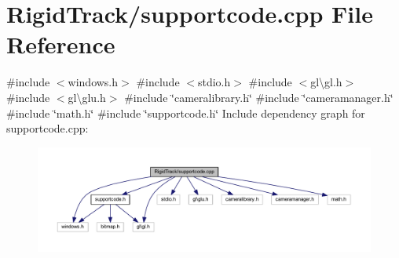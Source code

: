 \section{Rigid\+Track/supportcode.cpp File Reference}
\label{supportcode_8cpp}
{\ttfamily \#include $<$windows.\+h$>$}\newline
{\ttfamily \#include $<$stdio.\+h$>$}\newline
{\ttfamily \#include $<$gl\textbackslash{}gl.\+h$>$}\newline
{\ttfamily \#include $<$gl\textbackslash{}glu.\+h$>$}\newline
{\ttfamily \#include \char`\"{}cameralibrary.\+h\char`\"{}}\newline
{\ttfamily \#include \char`\"{}cameramanager.\+h\char`\"{}}\newline
{\ttfamily \#include \char`\"{}math.\+h\char`\"{}}\newline
{\ttfamily \#include \char`\"{}supportcode.\+h\char`\"{}}\newline
Include dependency graph for supportcode.\+cpp\+:\nopagebreak
\begin{figure}[H]
\begin{center}
\leavevmode
\includegraphics[width=350pt]{supportcode_8cpp__incl}
\end{center}
\end{figure}
